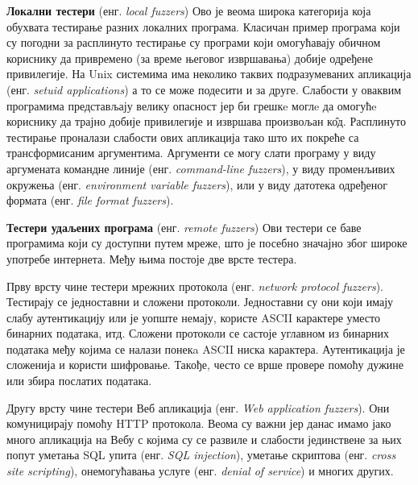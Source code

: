 \documentclass[12pt,oneside]{memoir}
\begin{document}
\begin{description}
\item \textbf{Локални тестери} (енг. \textit{local fuzzers}) Ово је веома широка категорија која обухвата тестирање разних локалних програма. Класичан пример програма који су погодни за расплинуто тестирање су програми који омогућавају обичном кориснику да привремено (за време његовог извршавања) добије одређене привилегије. На Unix системима има неколико таквих подразумеваних апликација (енг. \textit{setuid applications}) а то се може подесити и за друге. Слабости у оваквим програмима представљају велику опасност јер би грешкe моглe да омогућe кориснику да трајно добије привилегије и извршава произвољан к\^{о}д. Расплинуто тестирање проналази слабости ових апликација тако што их покреће са трансформисаним аргументима. Аргументи се могу слати програму у виду аргумената командне линије (енг. \textit{command-line fuzzers}), у виду променљивих окружења (енг. \textit{environment variable fuzzers}), или у виду датотека одређеног формата (енг. \textit{file format fuzzers}).
\item \textbf{Тестери удаљених програма} (енг. \textit{remote fuzzers}) Ови тестери се баве програмима који су доступни путем мреже, што је посебно значајно због широке употребе интернета. Међу њима постоје две врсте тестера. 

Прву врсту чине тестери мрежних протокола (енг. \textit{network protocol fuzzers}). Тестирају се једноставни и сложени протоколи. Једноставни су они који имају слабу аутентикацију или је уопште немају, користе ASCII карактере уместо бинарних података, итд. Сложени протоколи се састоје углавном из бинарних података међу којима се налази понекa ASCII ниска карактера. Аутентикација је сложенија и користи шифровање. Такође, често се врше провере помоћу дужине или збира послатих података.  

Другу врсту чине тестери Веб апликација (енг. \textit{Web application fuzzers}). Они комуницирају помоћу HTTP протокола. Веома су важни јер данас имамо јако много апликација на Вебу с којима су се развиле и слабости јединствене за њих попут уметања SQL упита (енг. \textit{SQL injection}), уметање скриптова (енг. \textit{cross site scripting}), онемогућавања услуге (енг. \textit{denial of service}) и многих других.


\end{description}
\end{document}
